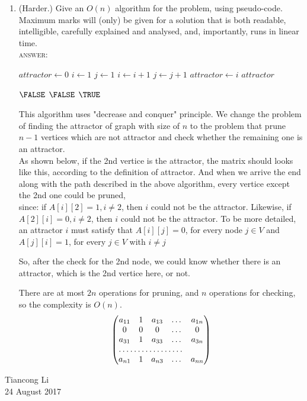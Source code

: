 \documentclass[11pt]{article}
\begin{document}
\begin{enumerate}
\begin{enumerate}
\item
(Harder.)
Give an $O(n)$ algorithm for the problem, using pseudo-code.
Maximum marks will (only) be given for a solution that is both
readable, intelligible, carefully explained and analysed,
and, importantly, runs in linear time.
\\
\textsc{answer}:
\par
\begin{algorithmic}
\State $attractor \gets 0$
\State $i \gets 1$
\State $j \gets 1$
    \State $i \gets i+1$
  \Else
    \State $j \gets j+1$
  \EndIf
\EndWhile
{}
  \State $attractor \gets i$
\EndIf
\Return $attractor$
\EndFunction

    \Return $\FALSE$
  \EndIf
    \Return $\FALSE$
  \EndIf
\EndFor
\Return $\TRUE$
\EndFunction
\end{algorithmic}
This algorithm uses "decrease and conquer" principle.
We change the problem of finding the attractor of graph with size of $n$
to the problem that prune $n-1$ vertices which are not attractor
and check whether the remaining one is an attractor.
\\
As shown below, if the 2nd vertice is the attractor,
the matrix should looks like this,
according to the definition of attractor.
And when we arrive the end along with the path described in the above algorithm,
every vertice except the 2nd one could be pruned,
\\since:
if $A[i][2] = 1, i \neq 2$, then $i$ could not be the attractor.
Likewise, if $A[2][i] = 0, i \neq 2$, then $i$ could not be the attractor.
To be more detailed, an attractor $i$ must satisfy that $A[i][j] = 0$,
for every node $j \in V$ and $A[j][i] = 1$, for every $j \in V$ with $i \neq j$

So, after the check for the 2nd node, we could know whether there is an attractor,
which is the 2nd vertice here, or not.

There are at most $2n$ operations for pruning, and $n$ operations for checking,
so the complexity is $O(n)$.
\begin{equation*}
\begin{pmatrix}
      a_{11} & 1 & a_{13}& \dots & a_{1n}\\
      0 & 0 & 0&\dots & 0\\
      a_{31} & 1 &a_{33}& \dots & a_{3n}\\
      \hdotsfor{4}\\
      a_{n1} & 1 &a_{n3}& \dots & a_{nn}
\end{pmatrix}
\end{equation*}
\end{enumerate}

\end{enumerate}



\begin{flushright}
Tiancong Li
\\ 24 August 2017
\end{flushright}
\end{document}
